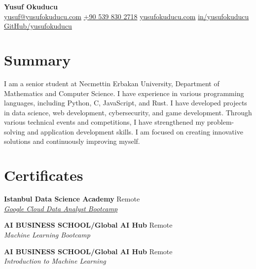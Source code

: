 \documentclass[10pt,a4paper]{extarticle}
\begin{document}
\begin{center}
    \begin{minipage}{\textwidth}
        \centering
        {\LARGE\textbf{Yusuf Okuducu}}\\[20pt]
        \href{mailto:yusuf@yusufokuducu.com}{yusuf@yusufokuducu.com} \quad
        \href{tel:+905398302718}{+90 539 830 2718} \quad
        \href{https://yusufokuducu.com}{yusufokuducu.com} \quad
        \href{https://linkedin.com/in/yusufokuducu}{in/yusufokuducu} \quad
        \href{https://github.com/yusufokuducu}{GitHub/yusufokuducu}
    \end{minipage}
\end{center}

\vspace{10pt}

\section{Summary}
I am a senior student at Necmettin Erbakan University, Department of Mathematics
and Computer Science. I have experience in various programming languages,
including Python, C, JavaScript, and Rust. I have developed projects in data science,
web development, cybersecurity, and game development. Through various technical
events and competitions, I have strengthened my problem-solving and application
development skills. I am focused on creating innovative solutions and continuously
improving myself.

\vspace{10pt}

\section{Certificates}
\textbf{Istanbul Data Science Academy} \hfill Remote\\
\textit{\href{https://istdatascience.com/certificate/DABYO237.pdf}{Google Cloud Data Analyst Bootcamp}}

\vspace{5pt}
\noindent\textbf{AI BUSINESS SCHOOL/Global AI Hub} \hfill Remote\\
\textit{Machine Learning Bootcamp}

\vspace{5pt}
\noindent\textbf{AI BUSINESS SCHOOL/Global AI Hub} \hfill Remote\\
\textit{Introduction to Machine Learning}

\vspace{10pt}
\end{document}
